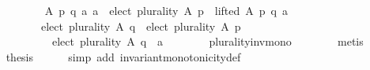 \begin{isabellebody}
\isanewline
\ \ \ \ \isamarkupfalse%
\isanewline
\ \ \ \ \ \ {\isachardoublequoteopen}{\isasymforall}A\ p\ q\ a{\isachardot}{\kern0pt}\ {\isacharparenleft}{\kern0pt}a\ {\isasymin}\ elect\ plurality\ A\ p\ {\isasymand}\ lifted\ A\ p\ q\ a{\isacharparenright}{\kern0pt}\ {\isasymlongrightarrow}\isanewline
\ \ \ \ \ \ \ \ \ \ {\isacharparenleft}{\kern0pt}elect\ plurality\ A\ q\ {\isacharequal}{\kern0pt}\ elect\ plurality\ A\ p\ {\isasymor}\isanewline
\ \ \ \ \ \ \ \ \ \ \ \ elect\ plurality\ A\ q\ {\isacharequal}{\kern0pt}\ {\isacharbraceleft}{\kern0pt}a{\isacharbraceright}{\kern0pt}{\isacharparenright}{\kern0pt}{\isachardoublequoteclose}\isanewline
\ \ \ \ \ \ \isamarkupfalse%
\ plurality{\isacharunderscore}{\kern0pt}inv{\isacharunderscore}{\kern0pt}mono{}\isanewline
\ \ \ \ \ \ \isamarkupfalse%
\ metis\isanewline
\ \ \isamarkupfalse%
\isanewline
\ \ \isamarkupfalse%
\ {\isacharquery}{\kern0pt}thesis\isanewline
\ \ \ \ \isamarkupfalse%
\ {\isacharparenleft}{\kern0pt}simp\ add{\isacharcolon}{\kern0pt}\ invariant{\isacharunderscore}{\kern0pt}monotonicity{\isacharunderscore}{\kern0pt}def{\isacharparenright}{\kern0pt}\isanewline
{}\isamarkupfalse%
%
\endisatagproof
{\isafoldproof}%
%
\isadelimproof
\isanewline
%
\endisadelimproof
%
\isadelimtheory
\isanewline
%
\endisadelimtheory
%
\isatagtheory
{}\isamarkupfalse%
%
\endisatagtheory
{\isafoldtheory}%
%
\isadelimtheory
%
\endisadelimtheory
%
\end{isabellebody}%
\endinput
